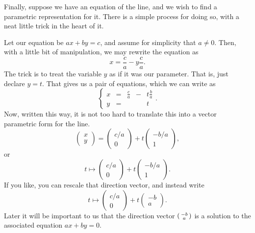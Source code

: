 \documentclass[00-livre-main.tex]{subfiles}
\begin{document}
Finally, suppose we have an equation of the line, and we wish to find a parametric representation for it. There is a simple process for doing so, with a neat little trick in the heart of it.

Let our equation be $ax+by=c$, and assume for simplicity that $a\neq 0$. Then, with a little bit of manipulation, we may rewrite the equation as 
\[
x = \frac{c}{a} - y \frac{c}{a}.
\]
The trick is to treat the variable $y$ as if it was our parameter. That is, just declare $y=t$. That gives us a pair of equations, which we can write as
\[
\left\{ \begin{array}{rrrrl} x & = & \frac{c}{a} & - & t\frac{b}{a} \\ y & = & & & t\end{array}\right. .
\]
Now, written this way, it is not too hard to translate this into a vector parametric form for the line.
\[
\begin{pmatrix} x \\ y \end{pmatrix} = \begin{pmatrix} c/a \\ 0 \end{pmatrix} + t \begin{pmatrix} -b/a \\ 1 \end{pmatrix},
\]
or
\[
t \mapsto \begin{pmatrix} c/a \\ 0 \end{pmatrix} + t \begin{pmatrix} -b/a \\ 1 \end{pmatrix} .
\]
If you like, you can rescale that direction vector, and instead write
\[
t \mapsto \begin{pmatrix} c/a \\ 0 \end{pmatrix} + t \begin{pmatrix} -b \\ a \end{pmatrix} .
\]
Later it will be important to us that the direction vector $\left(\begin{smallmatrix} -b \\ a \end{smallmatrix}\right)$ is a solution to the associated equation $ax+by=0$.
\end{document}

